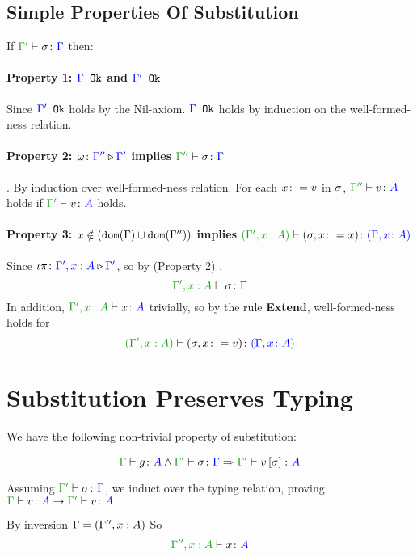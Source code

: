 \documentclass{report}
\begin{document}
\subsection{Simple Properties Of Substitution}
If $\typerelation{\G'}{\si}{\G}$ then:
    \paragraph{Property 1: ${\color{blue} \Gamma} \texttt{ Ok}$ and ${\color{blue} \Gamma'} \texttt{ Ok}$}
     Since ${\color{blue} \Gamma'} \texttt{ Ok}$ holds by the Nil-axiom. ${\color{blue} \Gamma} \texttt{ Ok}$ holds by induction on the well-formed-ness relation.
    \paragraph{Property 2: $\omega \colon {\color{blue}\Gamma''} \triangleright {\color {blue} \Gamma'}$ implies $\typerelation{\G''}{\si}{\G}$}. 
    By induction over well-formed-ness relation. For each $x\colon= v$ in $\sigma$, $\typerelation{\G''}{v}{A}$ holds if $\typerelation{\G'}{v}{A}$ holds.
    \paragraph{Property 3: $x \notin (\texttt{dom}(\Gamma) \cup \texttt{dom}(\Gamma''))$ implies $\typerelation{(\G', x: A)}{(\si, x \setto x)}{(\gax)}$} 
    Since $\iota\pi \colon {\color{blue}\Gamma',x: A} \triangleright {\color {blue} \Gamma'}$, so by (Property 2) , 
    $$\typerelation{\G', x: A}{\si}{\G}$$
    In addition, $\typerelation{\G', x: A}{x}{A}$ trivially, so by the rule \textbf{Extend}, well-formed-ness holds for
    \begin{equation}
        \typerelation{(\G', x:A)}{(\si, x\setto v)}{(\gax)}
    \end{equation}


\section{Substitution Preserves Typing}
We have the following non-trivial property of substitution:

\begin{equation}
    \typerelation{\G}{g}{A}\wedge\typerelation{\G'}{\si}{\G}\Rightarrow\typerelation{\G'}{v\ssi}{A}
\end{equation}

Assuming $\typerelation{\G'}{\si}{\G}$, we induct over the typing relation, proving $\gtyperelation{v}{A}\rightarrow\typerelation{\G'}{v}{A}$

        By inversion $\Gamma = (\Gamma'', x:A)$
        So \begin{equation}
            \typerelation{\G'',x:A}{x}{A}
        \end{equation}
\end{document}
